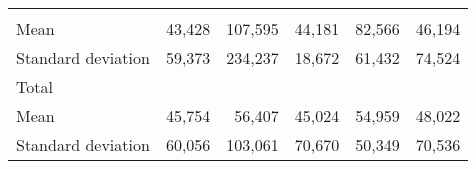 \begin{tabular}{llllll}
  \multicolumn{1}{|r}{} &
  \multicolumn{1}{r}{} &
  \multicolumn{1}{r}{} &
  \multicolumn{1}{r}{} &
  \multicolumn{1}{r}{} \\
\multicolumn{1}{l}{\hspace{4em}Mean} &
  \multicolumn{1}{|r}{43,428} &
  \multicolumn{1}{r}{107,595} &
  \multicolumn{1}{r}{44,181} &
  \multicolumn{1}{r}{82,566} &
  \multicolumn{1}{r}{46,194} \\
\multicolumn{1}{l}{\hspace{4em}Standard deviation} &
  \multicolumn{1}{|r}{59,373} &
  \multicolumn{1}{r}{234,237} &
  \multicolumn{1}{r}{18,672} &
  \multicolumn{1}{r}{61,432} &
  \multicolumn{1}{r}{74,524} \\
\multicolumn{1}{l}{\hspace{3em}Total} &
  \multicolumn{1}{|r}{} &
  \multicolumn{1}{r}{} &
  \multicolumn{1}{r}{} &
  \multicolumn{1}{r}{} &
  \multicolumn{1}{r}{} \\
\multicolumn{1}{l}{\hspace{4em}Mean} &
  \multicolumn{1}{|r}{45,754} &
  \multicolumn{1}{r}{56,407} &
  \multicolumn{1}{r}{45,024} &
  \multicolumn{1}{r}{54,959} &
  \multicolumn{1}{r}{48,022} \\
\multicolumn{1}{l}{\hspace{4em}Standard deviation} &
  \multicolumn{1}{|r}{60,056} &
  \multicolumn{1}{r}{103,061} &
  \multicolumn{1}{r}{70,670} &
  \multicolumn{1}{r}{50,349} &
  \multicolumn{1}{r}{70,536} \\
\cline{1-6}
\end{tabular}

